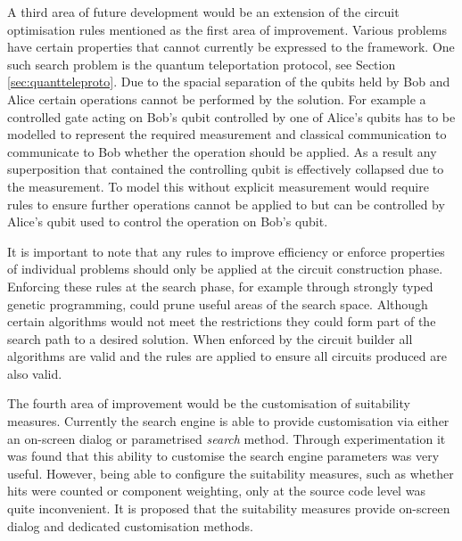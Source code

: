 A third area of future development would be an extension of the circuit optimisation rules mentioned as the first area of improvement.
Various problems have certain properties that cannot currently be expressed to the framework.
One such search problem is the quantum teleportation protocol, see Section \ref{sec:quantteleproto}.
Due to the spacial separation of the qubits held by Bob and Alice certain operations cannot be performed by the solution.
For example a controlled gate acting on Bob's qubit controlled by one of Alice's qubits has to be modelled to represent the required measurement and classical communication to communicate to Bob whether the operation should be applied.
As a result any superposition that contained the controlling qubit is effectively collapsed due to the measurement.
To model this without explicit measurement would require rules to ensure further operations cannot be applied to but can be controlled by Alice's qubit used to control the operation on Bob's qubit.

It is important to note that any rules to improve efficiency or enforce properties of individual problems should only be applied at the circuit construction phase.
Enforcing these rules at the search phase, for example through strongly typed genetic programming, could prune useful areas of the search space.
Although certain algorithms would not meet the restrictions they could form part of the search path to a desired solution.
When enforced by the circuit builder all algorithms are valid and the rules are applied to ensure all circuits produced are also valid.

The fourth area of improvement would be the customisation of suitability measures.
Currently the search engine is able to provide customisation via either an on-screen dialog or parametrised \emph{search} method.
Through experimentation it was found that this ability to customise the search engine parameters was very useful.
However, being able to configure the suitability measures, such as whether hits were counted or component weighting, only at the source code level was quite inconvenient.
It is proposed that the suitability measures provide on-screen dialog and dedicated customisation methods.

